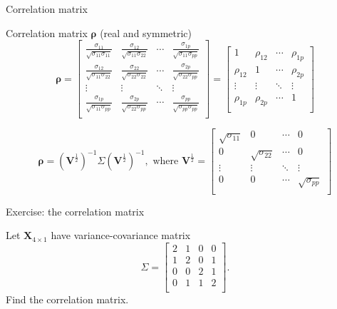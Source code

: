 \documentclass[ignorenonframetext,]{beamer}
\begin{document}
\begin{frame}

\begin{block}{Correlation matrix}

Correlation matrix \(\mathbf{\rho}\) (real and symmetric)
\[\mathbf{\rho}=\left[ \begin{array}{cccc}
    \frac{\sigma_{11}}{\sqrt{\sigma_{11}\sigma_{11}}} &
    \frac{\sigma_{12}}{\sqrt{\sigma_{11}\sigma_{22}}} &
    \cdots &
    \frac{\sigma_{1p}}{\sqrt{\sigma_{11}\sigma_{pp}}}\\
    \frac{\sigma_{12}}{\sqrt{\sigma_{11}\sigma_{22}}} &
    \frac{\sigma_{22}}{\sqrt{\sigma_{22}\sigma_{22}}} &
    \cdots &
    \frac{\sigma_{2p}}{\sqrt{\sigma_{22}\sigma_{pp}}}\\
    \vdots & \vdots & \ddots & \vdots\\
      \frac{\sigma_{1p}}{\sqrt{\sigma_{11}\sigma_{pp}}} &
    \frac{\sigma_{2p}}{\sqrt{\sigma_{22}\sigma_{pp}}} &
    \cdots &
    \frac{\sigma_{pp}}{\sqrt{\sigma_{pp}\sigma_{pp}}}\\ \end{array}\right]=
 \left[ \begin{array}{cccc}
    1 & \rho_{12} & \cdots & \rho_{1p}\\
    \rho_{12} & 1 & \cdots & \rho_{2p}\\
    \vdots & \vdots & \ddots & \vdots\\
    \rho_{1p} & \rho_{2p} & \cdots & 1\\
\end{array}\right]\]

\[\mathbf{\rho}=(\mathbf{V}^{\frac{1}{2}})^{-1}
    \Sigma(\mathbf{V}^{\frac{1}{2}})^{-1}, \text{   where    }
   \mathbf{V}^{\frac{1}{2}}=
 \left[ \begin{array}{cccc}
    \sqrt{\sigma_{11}} & 0& \cdots & 0\\
    0 & \sqrt{\sigma_{22}} & \cdots & 0\\
    \vdots & \vdots & \ddots & \vdots\\
    0 & 0 & \cdots & \sqrt{\sigma_{pp}}\\
\end{array} \right]\]

\end{block}

\end{frame}

\begin{frame}

\begin{block}{Exercise: the correlation matrix}

Let \(\mathbf{X}_{4\times 1}\) have variance-covariance matrix
\[\Sigma= \left[ \begin{array}{cccc} 2&1&0&0\\
      1&2&0&1\\
      0&0&2&1\\
      0&1&1&2\\
          \end{array}
          \right].\] Find the correlation matrix.

\end{block}

\end{frame}
\end{document}
